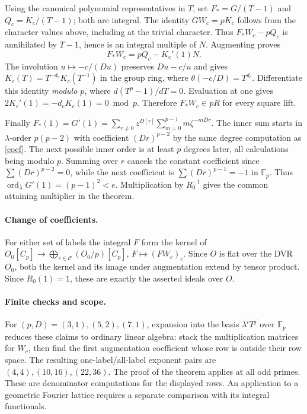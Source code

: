 \documentclass[11pt]{article}
\begin{document}
Using the canonical polynomial representatives in $T$, set
$F_*=G/(T-1)$ and $Q_c=K_c/(T-1)$; both are integral.
The identity $G W_c=pK_c$ follows from the character values
above, including at the trivial character. Thus $F_*W_c-pQ_c$
is annihilated by $T-1$, hence is an integral multiple of $N$.
Augmenting proves
\[
 F_*W_c=pQ_c-K_c'(1)N.
\]
The involution $u\mapsto-c/(Du)$ preserves $Du-c/u$ and gives
$K_c(T)=T^{-d_c}K_c(T^{-1})$ in the group ring, where
$\theta(-c/D)=T^{d_c}$. Differentiate this identity \emph{modulo $p$},
where $d(T^p-1)/dT=0$. Evaluation at one gives
$2K_c'(1)=-d_cK_c(1)=0\bmod p$. Therefore $F_*W_c\in pR$
for every square lift.

Finally $F_*(1)=G'(1)=
\sum_{r\ne0}z^{D[r]}\sum_{m=0}^{p-1}m\zeta^{-mDr}$.
The inner sum starts in $\lambda$-order $p(p-2)$ with coefficient
$(Dr)^{p-2}$ by the same degree computation as \eqref{coef}.
The next possible inner order is at least $p$ degrees later,
all calculations being modulo $p$. Summing over $r$ cancels
the constant coefficient since $\sum(Dr)^{p-2}=0$, while the next
coefficient is $\sum(Dr)^{p-1}=-1$ in $\mathbb F_p$.
Thus $\operatorname{ord}_{\lambda} G'(1)=(p-1)^2<e$. Multiplication by $R_0^{-1}$
gives the common attaining multiplier in the theorem.

\paragraph{Change of coefficients.}
For either set of labels the integral $F$ form the kernel of
$O_0[C_p]\to\bigoplus_{c\in\mathcal C}(O_0/p)[C_p]$,
$F\mapsto(FW_c)_c$. Since $O$ is flat over the DVR $O_0$,
both the kernel and its image under augmentation extend by
tensor product. Since $R_0(1)=1$, these are exactly the asserted
ideals over $O$.

\paragraph{Finite checks and scope.}
For $(p,D)=(3,1),(5,2),(7,1)$, expansion into the basis
$\lambda^iT^j$ over $\mathbb F_p$ reduces these claims to ordinary linear
algebra: stack the multiplication matrices for $W_c$, then find
the first augmentation coefficient whose row is outside their row
space. The resulting one-label/all-label exponent pairs are
$(4,4),(10,16),(22,36)$. The proof of the theorem applies at all
odd primes. These are denominator computations for the displayed
rows. An application to a geometric Fourier lattice requires a
separate comparison with its integral functionals.
\end{document}
